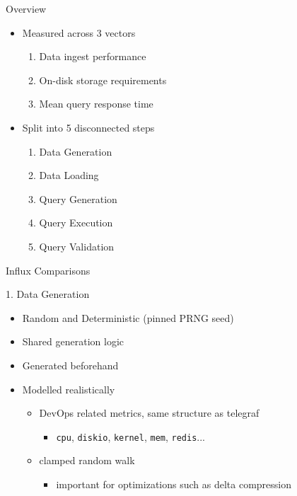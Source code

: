 \documentclass[compress,aspectratio=169]{beamer}
\begin{document}
\begin{frame}{Overview}
\begin{itemize}
  \item Measured across 3 vectors
  \begin{enumerate}
    \item Data ingest performance
    \item On-disk storage requirements
    \item Mean query response time
  \end{enumerate}
\item Split into 5 disconnected steps
  \begin{enumerate}
    \item Data Generation
    \item Data Loading
    \item Query Generation
    \item Query Execution
    \item Query Validation
  \end{enumerate}
\end{itemize}
\end{frame}

\begin{frame}{Influx Comparisons}
\begin{block}{1. Data Generation}
\begin{itemize}
  \item Random and Deterministic (pinned PRNG seed)
  \item Shared generation logic
  \item Generated beforehand
  \item Modelled realistically
  \begin{itemize}
    \item DevOps related metrics, same structure as telegraf
    \begin{itemize}
      \item \texttt{cpu}, \texttt{diskio}, \texttt{kernel}, \texttt{mem}, \texttt{redis}...
    \end{itemize}
    \item clamped random walk
    \begin{itemize}
      \item important for optimizations such as delta compression
    \end{itemize}
  \end{itemize}
\end{itemize}
\end{block}
\end{frame}
\end{document}
